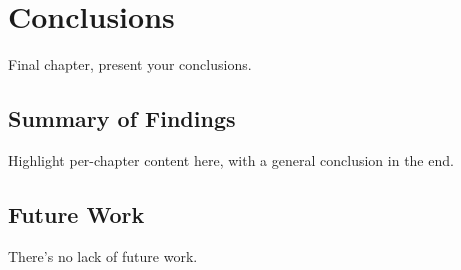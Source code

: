 \chapter{Conclusions}
\label{c:conc}
Final chapter, present your conclusions.


\section{Summary of Findings}
Highlight per-chapter content here, with a general conclusion in the end.


\section{Future Work}
There's no lack of future work.